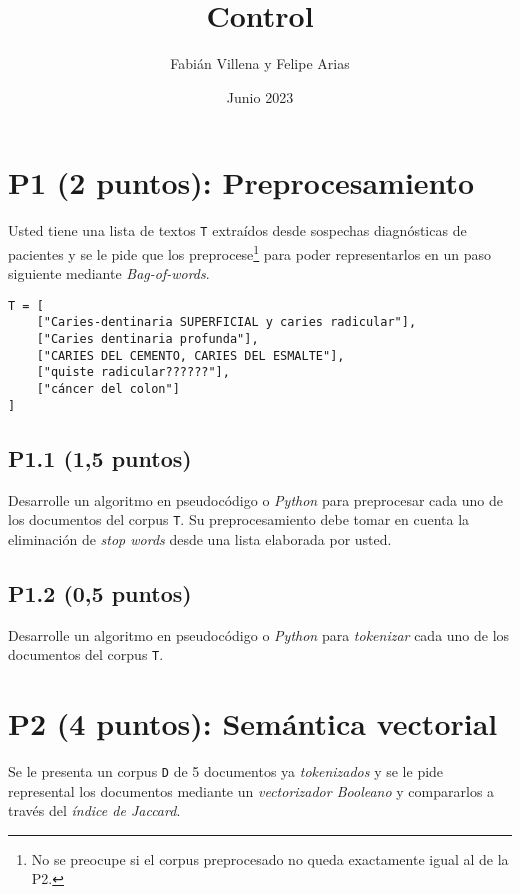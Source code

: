\documentclass{article}
\title{Control}
\author{Fabián Villena y Felipe Arias}
\date{Junio 2023}
\begin{document}
\maketitle

\section*{P1 (2 puntos): Preprocesamiento}

Usted tiene una lista de textos \texttt{T} extraídos desde sospechas diagnósticas de pacientes y se le pide que los preprocese\footnote{No se preocupe si el corpus preprocesado no queda exactamente igual al de la P2.} para poder representarlos en un paso siguiente mediante \textit{Bag-of-words}.

\begin{verbatim}
T = [
    ["Caries-dentinaria SUPERFICIAL y caries radicular"],
    ["Caries dentinaria profunda"],
    ["CARIES DEL CEMENTO, CARIES DEL ESMALTE"],
    ["quiste radicular??????"],
    ["cáncer del colon"]
]
\end{verbatim}

\subsection*{P1.1 (1,5 puntos)}

Desarrolle un algoritmo en pseudocódigo o \textit{Python} para preprocesar cada uno de los documentos del corpus \texttt{T}. Su preprocesamiento debe tomar en cuenta la eliminación de \textit{stop words} desde una lista elaborada por usted.

\subsection*{P1.2 (0,5 puntos)}

Desarrolle un algoritmo en pseudocódigo o \textit{Python} para \textit{tokenizar} cada uno de los documentos del corpus \texttt{T}.

\newpage

\section*{P2 (4 puntos): Semántica vectorial}

Se le presenta un corpus \texttt{D} de 5 documentos ya \textit{tokenizados} y se le pide represental los documentos mediante un \textit{vectorizador Booleano} y compararlos a través del \textit{índice de Jaccard}.
\end{document}
